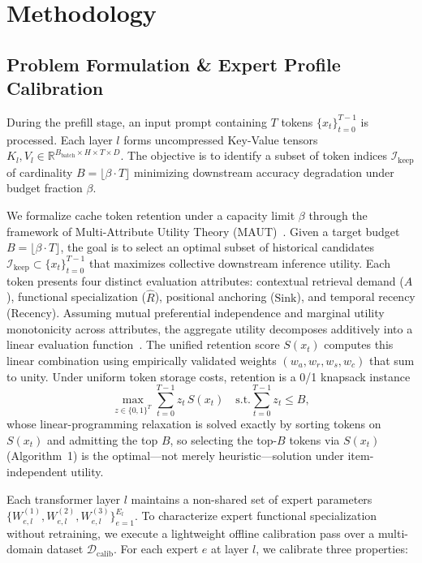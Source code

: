\documentclass[conference]{IEEEtran}
\begin{document}
\section{Methodology}
\subsection{Problem Formulation \& Expert Profile Calibration}
During the prefill stage, an input prompt containing $T$ tokens $\{x_t\}_{t=0}^{T-1}$ is processed. Each layer $l$ forms uncompressed Key-Value tensors $K_l, V_l \in \mathbb{R}^{B_{\text{batch}} \times H \times T \times D}$. The objective is to identify a subset of token indices $\mathcal{I}_{\text{keep}}$ of cardinality $B = \lfloor \beta \cdot T \rfloor$ minimizing downstream accuracy degradation under budget fraction $\beta$.

We formalize cache token retention under a capacity limit $\beta$ through the framework of Multi-Attribute Utility Theory (MAUT)~\cite{keeney1993decisions}. Given a target budget $B = \lfloor \beta \cdot T \rfloor$, the goal is to select an optimal subset of historical candidates $\mathcal{I}_{\text{keep}} \subset \{x_t\}_{t=0}^{T-1}$ that maximizes collective downstream inference utility. Each token presents four distinct evaluation attributes: contextual retrieval demand ($\hat{A}$), functional specialization ($\hat{R}$), positional anchoring ($\text{Sink}$), and temporal recency ($\text{Recency}$). Assuming mutual preferential independence and marginal utility monotonicity across attributes, the aggregate utility decomposes additively into a linear evaluation function~\cite{keeney1993decisions}. The unified retention score $S(x_t)$ computes this linear combination using empirically validated weights $(w_a, w_r, w_s, w_c)$ that sum to unity. Under uniform token storage costs, retention is a 0/1 knapsack instance
\begin{equation}
    \max_{z \in \{0,1\}^T} \sum_{t=0}^{T-1} z_t \, S(x_t) \quad \text{s.t.} \sum_{t=0}^{T-1} z_t \le B,
    \label{eq:knapsack}
\end{equation}
whose linear-programming relaxation is solved exactly by sorting tokens on $S(x_t)$ and admitting the top $B$, so selecting the top-$B$ tokens via $S(x_t)$ (Algorithm~1) is the optimal---not merely heuristic---solution under item-independent utility.

Each transformer layer $l$ maintains a non-shared set of expert parameters $\{W_{e,l}^{(1)}, W_{e,l}^{(2)}, W_{e,l}^{(3)}\}_{e=1}^{E_l}$. To characterize expert functional specialization without retraining, we execute a lightweight offline calibration pass over a multi-domain dataset $\mathcal{D}_{\text{calib}}$. For each expert $e$ at layer $l$, we calibrate three properties:
\end{document}
